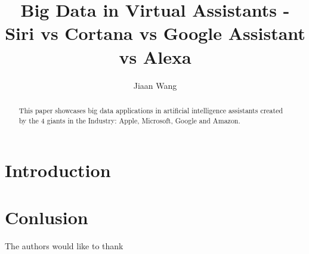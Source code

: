 \documentclass[sigconf]{acmart}
\begin{document}
\title{Big Data in Virtual Assistants - Siri vs Cortana vs Google Assistant vs Alexa}


\author{Jiaan Wang}


\begin{abstract}

    This paper showcases big data applications in artificial intelligence
    assistants created by the 4 giants in the Industry:
    Apple, Microsoft, Google and Amazon.
      
\end{abstract}


\maketitle

\section{Introduction}

\section{} 

\section{Conlusion}


\begin{acks}

  The authors would like to thank 

\end{acks}


 
\end{document}
